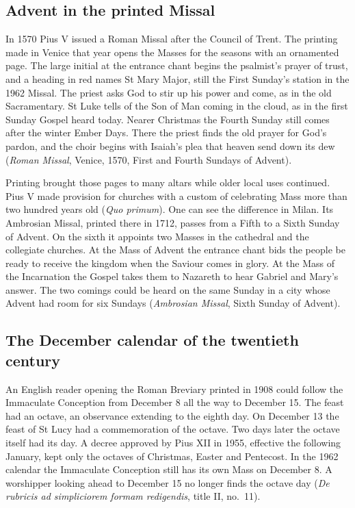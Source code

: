 \subsection{Advent in the printed Missal}

In 1570 Pius V issued a Roman Missal after the Council of Trent. The printing
made in Venice that year opens the Masses for the seasons with an ornamented
page. The large initial at the entrance chant begins the psalmist's prayer
of trust, and a heading in red names St Mary Major, still the First
Sunday's station in the 1962 Missal. The priest asks God to stir up his
power and come, as in the old Sacramentary. St Luke tells of the Son of Man
coming in the cloud, as in the first Sunday Gospel heard today. Nearer
Christmas the Fourth Sunday still comes after the winter Ember Days. There
the priest finds the old prayer for God's pardon, and the choir begins with
Isaiah's plea that heaven send down its dew (\emph{Roman Missal}, Venice,
1570, First and Fourth Sundays of Advent).

Printing brought those pages to many altars while older local uses
continued. Pius V made provision for churches with a custom of
celebrating Mass more than two hundred years old (\emph{Quo primum}).
One can see the difference in Milan. Its Ambrosian Missal, printed
there in 1712, passes from a Fifth to a Sixth Sunday of Advent. On the
sixth it appoints two Masses in the cathedral and the collegiate
churches. At the Mass of Advent the entrance chant bids the people be
ready to receive the kingdom when the Saviour comes in glory. At the
Mass of the Incarnation the Gospel takes them to Nazareth to hear
Gabriel and Mary's answer. The two comings could be heard on the same
Sunday in a city whose Advent had room for six Sundays
(\emph{Ambrosian Missal}, Sixth Sunday of Advent).

\subsection{The December calendar of the twentieth century}

An English reader opening the Roman Breviary printed in 1908 could
follow the Immaculate Conception from December 8 all the way to
December 15. The feast had an octave, an observance extending to the
eighth day. On December 13 the feast of St Lucy had a commemoration
of the octave. Two days later the octave itself had its day. A decree
approved by Pius XII in 1955, effective the following January, kept
only the octaves of Christmas, Easter and Pentecost. In the 1962
calendar the Immaculate Conception still has its own Mass on
December 8. A worshipper looking ahead to December 15 no longer finds
the octave day (\emph{De rubricis ad simpliciorem formam redigendis},
title II, no.~11).

